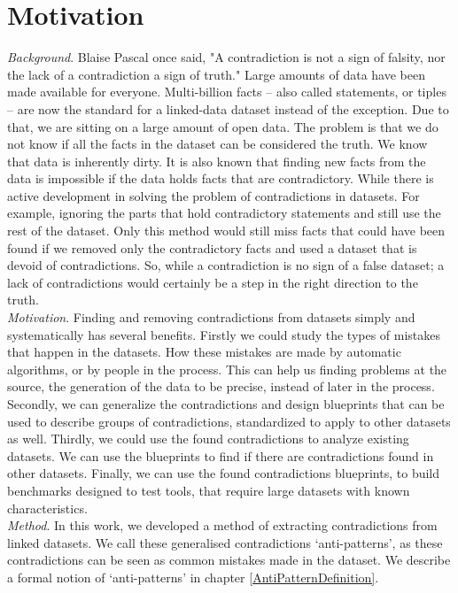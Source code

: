 \documentclass[11pt,letterpaper ,oneside ]{book}
\begin{document}
	\section{Motivation}
	\textit{Background}. Blaise Pascal once said, "A contradiction is not a sign of falsity, nor the lack of a contradiction a sign of truth." Large amounts of data have been made available for everyone. Multi-billion facts – also called statements, or tiples – are now the standard for a linked-data dataset instead of the exception. Due to that, we are sitting on a large amount of open data. The problem is that we do not know if all the facts in the dataset can be considered the truth. We know that data is inherently dirty. It is also known that finding new facts from the data is impossible if the data holds facts that are contradictory. While there is active development in solving the problem of contradictions in datasets. For example, ignoring the parts that hold contradictory statements and still use the rest of the dataset. Only this method would still miss facts that could have been found if we removed only the contradictory facts and used a dataset that is devoid of contradictions. So, while a contradiction is no sign of a false dataset; a lack of contradictions would certainly be a step in the right direction to the truth.\\
	
	\textit{Motivation}. Finding and removing contradictions from datasets simply and systematically has several benefits. Firstly we could study the types of mistakes that happen in the datasets. How these mistakes are made by automatic algorithms, or by people in the process. This can help us finding problems at the source, the generation of the data to be precise, instead of later in the process. \\
	Secondly, we can generalize the contradictions and design blueprints that can be used to describe groups of contradictions, standardized to apply to other datasets as well. Thirdly, we could use the found contradictions to analyze existing datasets. We can use the blueprints to find if there are contradictions found in other datasets. 
	Finally, we can use the found contradictions blueprints, to build benchmarks designed to test tools, that require large datasets with known characteristics.\\
	
	\textit{Method}. In this work, we developed a method of extracting contradictions from linked datasets. We call these generalised contradictions `anti-patterns', as these contradictions can be seen as common mistakes made in the dataset. We describe a formal notion of `anti-patterns' in chapter \ref{AntiPatternDefinition}.\\
	
\end{document}
